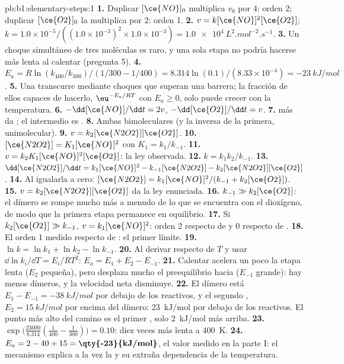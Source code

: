 \begin{solution}{pb:b1:elementary-steps:1}
\textbf{1.} Duplicar $[\ce{NO}]_0$ multiplica $v_0$ por 4: orden 2;
duplicar $[\ce{O2}]_0$ la multiplica por 2: orden 1.
\textbf{2.} $v = k[\ce{NO}]^2[\ce{O2}]$; $k = 1.0 \times 10^{-5}/((1.0
\times 10^{-3})^2 \times 1.0 \times 10^{-3}) =
\qty{1.0e4}{L^2.mol^{-2}.s^{-1}}$.
\textbf{3.} Un choque simultáneo de tres moléculas es raro, y una sola
etapa no podría hacerse más lenta al calentar (pregunta 5).
\textbf{4.} $E_a = R\ln(k_{400}/k_{300})/(1/300 - 1/400) = 8.314 \ln(0.1)
/(8.33 \times 10^{-4}) = \qty{-23}{kJ/mol}$.
\textbf{5.} Una  transcurre mediante choques que superan
una barrera; la fracción de ellos capaces de hacerlo, $\eu^{-E_a/RT}$ con
$E_a \ge
0$, solo puede crecer con la temperatura.
\textbf{6.} $-\dd[\ce{NO}]/\dd t = 2v$, $-\dd[\ce{O2}]/\dd t = v$.
\textbf{7.}  más  da
; el intermedio es .
\textbf{8.} Ambas bimoleculares (y la inversa de la primera,
unimolecular).
\textbf{9.} $v = k_2[\ce{N2O2}][\ce{O2}]$.
\textbf{10.} $[\ce{N2O2}] = K_1[\ce{NO}]^2$ con $K_1 = k_1/k_{-1}$.
\textbf{11.} $v = k_2K_1[\ce{NO}]^2[\ce{O2}]$: la ley observada.
\textbf{12.} $k = k_1k_2/k_{-1}$.
\textbf{13.} $\dd[\ce{N2O2}]/\dd t = k_1[\ce{NO}]^2 - k_{-1}[\ce{N2O2}] -
k_2[\ce{N2O2}][\ce{O2}]$.
\textbf{14.} Al igualarla a cero: $[\ce{N2O2}] = k_1[\ce{NO}]^2/(k_{-1} +
k_2[\ce{O2}])$.
\textbf{15.} $v = k_2[\ce{N2O2}][\ce{O2}]$ da la ley enunciada.
\textbf{16.} $k_{-1} \gg k_2[\ce{O2}]$: el dímero se rompe mucho más a
menudo de lo que se encuentra con el dioxígeno, de modo que la primera
etapa permanece en equilibrio.
\textbf{17.} Si $k_2[\ce{O2}] \gg k_{-1}$, $v = k_1[\ce{NO}]^2$: orden 2
respecto de  y 0 respecto de .
\textbf{18.} El orden 1 medido respecto de : el primer límite.
\textbf{19.} $\ln k = \ln k_1 + \ln k_2 - \ln k_{-1}$.
\textbf{20.} Al derivar respecto de $T$ y usar $\dd\ln k_i/\dd T
= E_i/RT^2$: $E_a = E_1 + E_2 - E_{-1}$.
\textbf{21.} Calentar acelera un poco la etapa lenta ($E_2$ pequeña), pero
desplaza mucho el preequilibrio hacia  ($E_{-1}$ grande): hay
menos dímeros, y la velocidad neta disminuye.
\textbf{22.} El dímero está $E_1 - E_{-1} = \qty{-38}{kJ/mol}$ por debajo
de los reactivos, y el segundo , $E_2 = \qty{15}{kJ/mol}$
por encima del dímero: \qty{23}{kJ/mol} por debajo de los reactivos. El
punto más alto del camino es el primer , solo
\qty{2}{kJ/mol} más arriba.
\textbf{23.} $\exp\big(\frac{23000}{8.314}(\frac{1}{400} - \frac{1}{300})\big)
= 0.10$: diez veces más lenta a \qty{400}{K}.
\textbf{24.} $E_a = 2 - 40 + 15 = \textbf{\qty{-23}{kJ/mol}}$, el valor
medido en la parte I: el mecanismo explica a la vez la  y
su extraña dependencia de la temperatura.
\end{solution}
